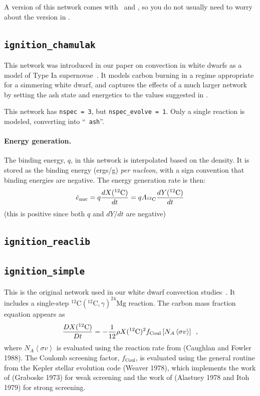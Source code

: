A version of this network comes with \maestro\ and \castro, so you do
not usually need to worry about the version in \microphysics.


\subsection{{\tt ignition\_chamulak}}

This network was introduced in our paper on convection in white dwarfs
as a model of Type Ia supernovae~\cite{wdconvect}.  It models
carbon burning in a regime appropriate for a simmering white dwarf,
and captures the effects of a much larger network by setting the ash
state and energetics to the values suggested in \cite{chamulak:2008}.

This network has {\tt nspec = 3}, but {\tt nspec\_evolve = 1}.  Only a
single reaction is modeled, converting  into ``{\tt
  ash}''.

\paragraph{Energy generation.} The binding energy, $q$, in this
network is interpolated based on the density.  It is stored as the
binding energy (ergs/g) {\em per nucleon}, with a sign convention that
binding energies are negative.  The energy generation rate is then:
\begin{equation}
\edot = q \frac{dX(\isotm{C}{12})}{dt} = q A_{\isotm{C}{12}} \frac{dY(\isotm{C}{12})}{dt}
\end{equation}
(this is positive since both $q$ and $dY/dt$ are negative)

\subsection{{\tt ignition\_reaclib}}

\subsection{{\tt ignition\_simple}}

This is the original network used in our white dwarf convection
studies~\cite{lowMach4}.  It includes a single-step
$^{12}\mathrm{C}(^{12}\mathrm{C},\gamma)^{24}\mathrm{Mg}$ reaction.
The carbon mass fraction equation appears as
\begin{equation}
\frac{D X(^{12}\mathrm{C})}{Dt} = - \frac{1}{12} \rho X(^{12}\mathrm{C})^2
    f_\mathrm{Coul} \left [N_A \left <\sigma v \right > \right]\enskip,
\end{equation}
where $N_A \left <\sigma v\right>$ is evaluated using the reaction
rate from (Caughlan and Fowler 1988).  The Coulomb screening factor,
$f_\mathrm{Coul}$, is evaluated using the general routine from the
Kepler stellar evolution code (Weaver 1978), which implements the work
of (Graboske 1973) for weak screening and the work of (Alastuey 1978
and Itoh 1979) for strong screening.


